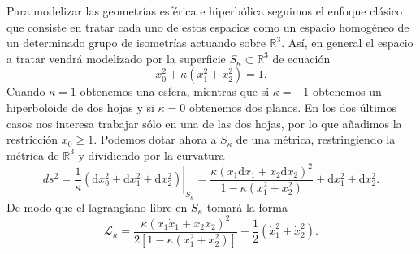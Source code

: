 \documentclass[11pt,a4paper,twoside]{article}
\theoremstyle{definition} \newtheorem{defn}[thm]{Definición}
\theoremstyle{definition} \newtheorem{ejemplo}[thm]{Ejemplo}
\theoremstyle{definition} \newtheorem{ejercicio}[thm]{Ejercicio}
\theoremstyle{remark} \newtheorem*{obs}{Observación}
\def\dd{\mathrm{d}}
\begin{document}
Para modelizar las geometrías esférica e hiperbólica seguimos el enfoque clásico que consiste en tratar cada uno de estos espacios como un espacio homogéneo de un determinado grupo de isometrías actuando sobre $\mathbb{R}^3$. Así, en general el espacio a tratar vendrá modelizado por la superficie $S_\kappa \subset \mathbb{R} ^3$ de ecuación
\begin{equation}
 x_0^2+\kappa(x_1^2+x_2^2)=1. 
\end{equation}
Cuando $\kappa=1$ obtenemos una esfera, mientras que si $\kappa=-1$ obtenemos un hiperboloide de dos hojas y si $\kappa=0$ obtenemos dos planos. En los dos últimos casos nos interesa trabajar sólo en una de las dos hojas, por lo que añadimos la restricción $x_0\geq 1$. Podemos dotar ahora a $S_\kappa$ de una métrica, restringiendo la métrica de $\mathbb{R} ^3$ y dividiendo por la curvatura
\begin{equation}
  ds^2=\left.\frac{1}{\kappa}(\dd x_0^2 +  \dd x_1^2 + \dd x_2^2)\right|_{S_\kappa}=\frac{\kappa (x_1\dd x_1+x_2 \dd x_2)^2}{1-\kappa(x_1^2+x_2^2)}+\dd x_1^2 + \dd x_2 ^2.
\end{equation}
De modo que el lagrangiano libre en $S_{\kappa}$ tomará la forma
\begin{equation}
  \mathcal{L} _\kappa=\frac{\kappa (x_1\dot{x}_1+x_2 \dot{x}_2)^2}{2[1-\kappa(x_1^2+x_2^2)]}+\frac{1}{2}(\dot{x}_1^2 + \dot{x}_2 ^2).
\end{equation}
\end{document}
